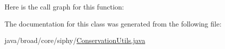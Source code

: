 Here is the call graph for this function\+:




The documentation for this class was generated from the following file\+:\begin{DoxyCompactItemize}
\item 
java/broad/core/siphy/\hyperlink{_conservation_utils_8java}{Conservation\+Utils.\+java}\end{DoxyCompactItemize}
